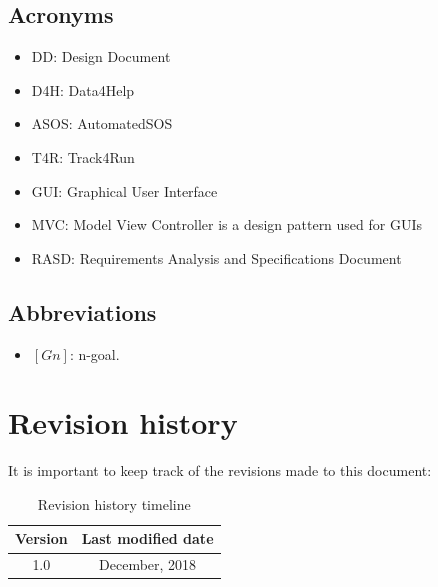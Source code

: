 \documentclass[a4paper, hidelinks, 12pt]{report}
\begin{document}
	\subsection{Acronyms}
	\begin{itemize}
		\item{DD}: Design Document
		\item{D4H}: Data4Help
		\item{ASOS}: AutomatedSOS
		\item{T4R}: Track4Run
		\item{GUI}: Graphical User Interface
		\item{MVC}: Model View Controller is a design pattern used for GUIs
		\item{RASD}: Requirements Analysis and Specifications Document
	\end{itemize}
	
	\subsection{Abbreviations}
	\begin{itemize}
		\item $[Gn]$: n-goal.
	\end{itemize}
	
	\section{Revision history}
	It is important to keep track of the revisions made to this document: \\
	
	\begin{table}[h]
		\centering
		\begin{tabular}{c c}
			\hline\hline
			\textbf{Version} & \textbf{Last modified date} \\ [0.5ex]
			\hline
			1.0 &  \nth{10} December, 2018  \\
			\hline
		\end{tabular}
		\caption{Revision history timeline}
		\label{fig:Revision history}
	\end{table}
	
\end{document}
